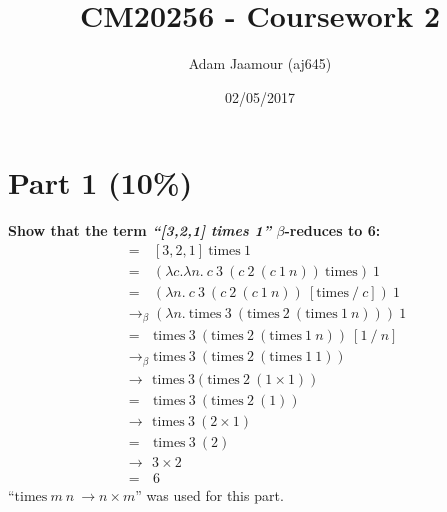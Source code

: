 \documentclass{article}
\title{CM20256 - Coursework 2}
\date{02/05/2017}
\author{Adam Jaamour (aj645)}
\begin{document}

	\newcommand{\lamb}{$\lambda$}
	\newcommand{\la}{\lambda}
	\newcommand{\be}{$\beta$}
	
	\newcommand{\sa}{\quad}
	\newcommand{\saq}{\, \, \, \,}	
	
	\newcommand{\equals}{\rightarrow_\beta}
	\newcommand{\equalsT}{\sa \rightarrow_\beta^*\sa}
	
	\newcommand{\tim}{\text{times}}
	
	
	
	\maketitle
	\newpage
	
	\begin{Large}
		\tableofcontents
	\end{Large}
	\newpage
	
	\pagenumbering{arabic}
	
	
	\section{Part 1 (10\%)}

	\begin{Large}
		\textbf{Show that the term \textit{``[3,2,1] times 1''} $\beta$-reduces to 6:}
		\begin{align*}
			&= \saq [3,2,1] \ \tim \ 1 \\
			&= \saq (\la c. \la n . \ c \ 3 \ (c \ 2 \ (c \ 1 \ n)) \ \tim ) \ 1 \\
			&= \saq (\la n . \ c \ 3 \ (c \ 2 \ (c \ 1 \ n)) \ [\tim \ / \ c ]) \ 1 \\
			&\equals (\la n . \ \tim \ 3 \ (\tim \ 2 \ (\tim \ 1 \ n))) \ 1 \\
			&= \saq \tim \ 3 \ (\tim \ 2 \ (\tim \ 1 \ n)) \ [1 \ / \ n] \\
			&\equals \tim \ 3 \ (\tim \ 2 \ (\tim \ 1 \ 1)) \\
			&\rightarrow \: \, \tim \ 3(\tim \ 2 \ (1 \times 1)) \\
			&= \saq \tim \ 3 \ (\tim \ 2 \ (1)) \\
			&\rightarrow \: \, \tim \ 3 \ (2 \times 1) \\
			&= \saq \tim \ 3 \ (2) \\
			&\rightarrow \: \, 3 \times 2 \\
			&= \saq 6
		\end{align*}
		``$\tim \ m \ n \ \rightarrow n \times m$'' was used for this part.
	\end{Large}
	\newpage
	
\end{document}
